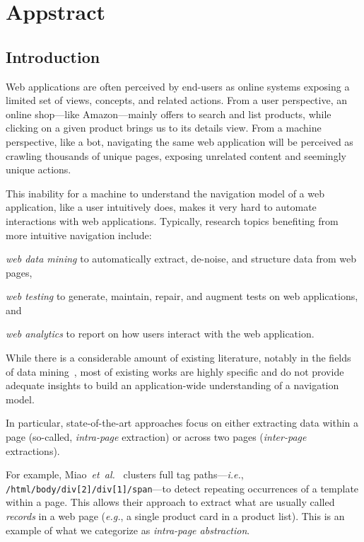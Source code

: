 \chapter{Appstract}\label{chap:appstract}
\section{Introduction}\label{sec:introduction}
Web applications are often perceived by end-users as online systems exposing a limited set of views, concepts, and related actions.
From a user perspective, an online shop---like Amazon---mainly offers to search and list products, while clicking on a given product brings us to its details view. 
From a machine perspective, like a bot, navigating the same web application will be perceived as crawling thousands of unique pages, exposing unrelated content and seemingly unique actions.

This inability for a machine to understand the navigation model of a web application, like a user intuitively does, makes it very hard to automate interactions with web applications.
Typically, research topics benefiting from more intuitive navigation include:
\begin{inparaenum}[\it (a)]
    \item \emph{web data mining} to automatically extract, de-noise, and structure data from web pages,
    \item \emph{web testing} to generate, maintain, repair, and augment tests on web applications, and
    \item \emph{web analytics} to report on how users interact with the web application.
\end{inparaenum}

While there is a considerable amount of existing literature, notably in the fields of data mining~\cite{Zhai2005WebAlignment, ArasuExtractingPages, Crescenzi2001RoadRunner:Sites, Sarawagi1996InformationExtraction, ChaudhariTemplatePages, MiaoExtractingClustering}, most of existing works are highly specific and do not provide adequate insights to build an application-wide understanding of a navigation model.

In particular, state-of-the-art approaches focus on either extracting data within a page (so-called, \emph{intra-page} extraction) or across two pages (\emph{inter-page} extractions). 

For example, Miao~\textit{et~al.}~\cite{MiaoExtractingClustering} clusters full tag paths---\emph{i.e.}, \texttt{/html/bo\-dy/div[2]/div[1]/span}---to detect repeating occurrences of a template within a page.
This allows their approach to extract what are usually called \emph{records} in a web page (\emph{e.g.}, a single product card in a product list).
This is an example of what we categorize as \emph{intra-page abstraction}.

